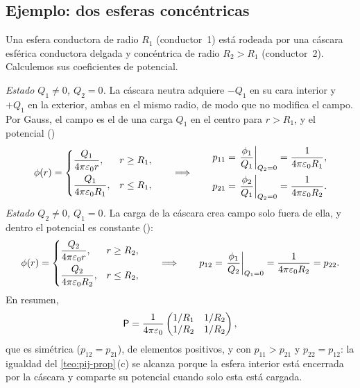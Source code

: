 

\subsection{Ejemplo: dos esferas concéntricas}\label{sec:ej-concentricas}
\begin{ejemplo}\label{ej:concentricas}
Una esfera conductora de radio $R_1$ (conductor~1) está rodeada por una cáscara esférica conductora delgada y concéntrica de radio $R_2>R_1$
(conductor~2). Calculemos sus coeficientes de potencial.

\emph{Estado $Q_1\neq0$, $Q_2=0$.} La cáscara neutra adquiere $-Q_1$ en su cara interior y $+Q_1$ en la exterior, ambas en el mismo radio, de modo que
no modifica el campo. Por Gauss, el campo es el de una carga $Q_1$ en el centro para $r>R_1$, y el potencial ()
\[
  \phi(r)=\begin{cases}\dfrac{Q_1}{4\pi\varepsilon_{0} r}, & r\ge R_1,\\[8pt] \dfrac{Q_1}{4\pi\varepsilon_{0} R_1}, & r\le R_1,\end{cases}
  \qquad\Longrightarrow\qquad
  \begin{aligned}
    p_{11}&=\left.\frac{\phi_1}{Q_1}\right|_{Q_2=0}=\frac{1}{4\pi\varepsilon_{0} R_1},\\
    p_{21}&=\left.\frac{\phi_2}{Q_1}\right|_{Q_2=0}=\frac{1}{4\pi\varepsilon_{0} R_2}.
  \end{aligned}
\]
\emph{Estado $Q_2\neq0$, $Q_1=0$.} La carga de la cáscara crea campo solo fuera de ella, y dentro el potencial es constante ():
\[
  \phi(r)=\begin{cases}\dfrac{Q_2}{4\pi\varepsilon_{0} r}, & r\ge R_2,\\[8pt] \dfrac{Q_2}{4\pi\varepsilon_{0} R_2}, & r\le R_2,\end{cases}
  \qquad\Longrightarrow\qquad p_{12}=\left.\frac{\phi_1}{Q_2}\right|_{Q_1=0}=\frac{1}{4\pi\varepsilon_{0} R_2}=p_{22}.
\]
En resumen,
\begin{equation}\label{eq:p-concentricas}
  \mathsf{P}=\frac{1}{4\pi\varepsilon_{0}}\begin{pmatrix}1/R_1 & 1/R_2\\ 1/R_2 & 1/R_2\end{pmatrix},
\end{equation}
que es simétrica ($p_{12}=p_{21}$), de elementos positivos, y con $p_{11}>p_{21}$ y $p_{22}=p_{12}$: la igualdad del \cref{teo:pij-prop}\,(c) se alcanza
porque la esfera interior está encerrada por la cáscara y comparte su potencial cuando solo esta está cargada.
\end{ejemplo}

